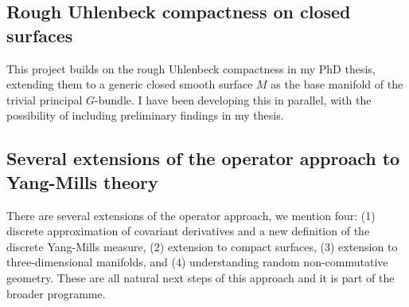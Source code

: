 \documentclass[12pt]{article}
\numberwithin{equation}{section}
\theoremstyle{definition}
\theoremstyle{remark}
\newcommand{\1}{\mathbf 1}
\newcommand{\<}{\langle}
\renewcommand{\>}{\rangle}
\begin{document}
\subsection{Rough Uhlenbeck compactness on closed surfaces}
%
This project builds on the rough Uhlenbeck compactness in my PhD thesis, extending them to a generic closed smooth surface $M$ as the base manifold of the trivial principal $G$-bundle. I have been developing this in parallel, with the possibility of including preliminary findings in my thesis.
%
%




%
\subsection{Several extensions of the operator approach to Yang-Mills theory}\label{sec:ext_Dirac}
%
There are several extensions of the operator approach, we mention four: (1) discrete approximation of covariant derivatives and a new definition of the discrete Yang-Mills measure, (2) extension to compact surfaces, (3) extension to three-dimensional manifolds, and (4) understanding random non-commutative geometry.  These are all natural next steps of this approach and it is part of the broader programme. 
\end{document}

